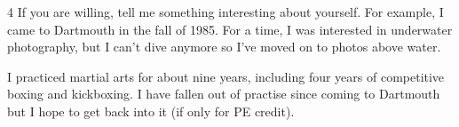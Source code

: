 \documentclass[12pt]{article}
\begin{document}
\vspace{1em}


\begin{problem}{4}
    If you are willing, tell me something interesting about yourself. For example, I came to Dartmouth in the fall of 1985. For a time, I was interested in underwater photography, but I can't dive anymore so I've moved on to photos above water.
\end{problem}

\begin{solution}
    \bbni 
    
    I practiced martial arts for about nine years, including four years of competitive boxing and kickboxing. I have fallen out of practise since coming to Dartmouth but I hope to get back into it (if only for PE credit). 
\end{solution}
\end{document}
